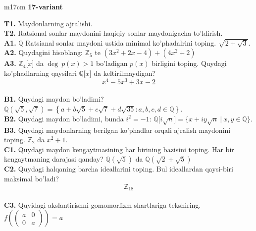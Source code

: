 \documentclass{article}
\begin{document}
\begin{tabular}{m{17cm}}
\textbf{17-variant}
\newline

\textbf{T1.} Maydonlarning ajralishi. \\
\textbf{T2.} Ratsional sonlar maydonini haqiqiy sonlar maydonigacha to'ldirish. \\
\textbf{A1.} \(\mathbb{Q}\) Ratsianal sonlar maydoni ustida minimal ko'phadalrini toping.
\(\sqrt{2 + \sqrt{3}}\). \\
\textbf{A2.} Quydagini hisoblang:
\(\mathbb{Z}_{5}\) te \(\left( 3x^{2} + 2x - 4 \right) + \left( 4x^{2} + 2 \right)\) \\
\textbf{A3.} \(\mathbb{Z}_{4}\lbrack x\rbrack\) da \(\deg\ p(x) > 1\) bo'ladigan \(p(x)\) birligini toping. Quydagi ko'phadlarning qaysilari \(\mathbb{Q\lbrack}x\rbrack\) da keltirilmaydigan?
\[x^{4} - 5x^{3} + 3x - 2\] \\
\textbf{B1.} Quydagi maydon bo'ladimi?
\(\mathbb{Q}\left( \sqrt{5},\sqrt{7} \right) = \left\{ a + b\sqrt{5} + c\sqrt{7} + d\sqrt{35}:a,b,c,d \in \mathbb{Q} \right\}\). \\
\textbf{B2.} Quydagi maydon bo'ladimi, bunda \(i^{2} = - 1\):
\(\mathbb{Q\lbrack}i\sqrt{n}\rbrack = \{ x + iy\sqrt{n}\ |\ x,y \in \mathbb{Q\}}\). \\
\textbf{B3.} Quydagi maydonlarning berilgan ko'phadlar orqali ajralish maydonini toping.
\(\mathbb{Z}_{2}\) da \(x^{2} + 1\). \\
\textbf{C1.} Quydagi maydon kengaytmasining har birining bazisini toping. Har bir kengaytmaning darajasi qanday?
\(\mathbb{Q}\left( \sqrt{5} \right)\) da \(\mathbb{Q}\left( \sqrt{2} + \sqrt{5} \right)\) \\
\textbf{C2.} Quydagi halqaning barcha ideallarini toping. Bul ideallardan qaysi-biri maksimal bo'ladi?
\[\mathbb{Z}_{18}\] \\
\textbf{C3.} Quyidagi akslantirishni gomomorfizm shartlariga tekshiring. \(f\left( \begin{pmatrix}
a & 0 \\
0 & a
\end{pmatrix} \right) = a\) \\

\end{tabular}
\vspace{1cm}
\end{document}
